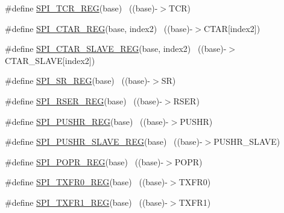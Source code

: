 \begin{DoxyCompactItemize}
\item 
\#define \hyperlink{group___s_p_i___register___accessor___macros_gac7b659989db7f592b223186299d8535e}{S\+P\+I\+\_\+\+T\+C\+R\+\_\+\+R\+EG}(base)                                            ~((base)-\/$>$T\+CR)
\item 
\#define \hyperlink{group___s_p_i___register___accessor___macros_ga5ab762c9000b796d14c1ce822eefc436}{S\+P\+I\+\_\+\+C\+T\+A\+R\+\_\+\+R\+EG}(base,  index2)                            ~((base)-\/$>$C\+T\+AR\mbox{[}index2\mbox{]})
\item 
\#define \hyperlink{group___s_p_i___register___accessor___macros_ga2025336cecfcf0c5b7cdb30e8056505b}{S\+P\+I\+\_\+\+C\+T\+A\+R\+\_\+\+S\+L\+A\+V\+E\+\_\+\+R\+EG}(base,  index2)                ~((base)-\/$>$C\+T\+A\+R\+\_\+\+S\+L\+A\+VE\mbox{[}index2\mbox{]})
\item 
\#define \hyperlink{group___s_p_i___register___accessor___macros_ga0621f5a9016db52860125b33dd3519a2}{S\+P\+I\+\_\+\+S\+R\+\_\+\+R\+EG}(base)                                              ~((base)-\/$>$SR)
\item 
\#define \hyperlink{group___s_p_i___register___accessor___macros_ga9f132bbe51ac921e48eb67afd580ed34}{S\+P\+I\+\_\+\+R\+S\+E\+R\+\_\+\+R\+EG}(base)                                          ~((base)-\/$>$R\+S\+ER)
\item 
\#define \hyperlink{group___s_p_i___register___accessor___macros_gacca7ae364ed1cf69ce3a13c76691ce63}{S\+P\+I\+\_\+\+P\+U\+S\+H\+R\+\_\+\+R\+EG}(base)                                        ~((base)-\/$>$P\+U\+S\+HR)
\item 
\#define \hyperlink{group___s_p_i___register___accessor___macros_gab2be31eae2e6d72caaac8897ed48099f}{S\+P\+I\+\_\+\+P\+U\+S\+H\+R\+\_\+\+S\+L\+A\+V\+E\+\_\+\+R\+EG}(base)                            ~((base)-\/$>$P\+U\+S\+H\+R\+\_\+\+S\+L\+A\+VE)
\item 
\#define \hyperlink{group___s_p_i___register___accessor___macros_ga57ef11c450e1a45e272be2849083977b}{S\+P\+I\+\_\+\+P\+O\+P\+R\+\_\+\+R\+EG}(base)                                          ~((base)-\/$>$P\+O\+PR)
\item 
\#define \hyperlink{group___s_p_i___register___accessor___macros_ga71b7e1c40b7f2d11e956b9814be20261}{S\+P\+I\+\_\+\+T\+X\+F\+R0\+\_\+\+R\+EG}(base)                                        ~((base)-\/$>$T\+X\+F\+R0)
\item 
\#define \hyperlink{group___s_p_i___register___accessor___macros_ga9011fe0adbd2dce8076c23bbe8aef929}{S\+P\+I\+\_\+\+T\+X\+F\+R1\+\_\+\+R\+EG}(base)                                        ~((base)-\/$>$T\+X\+F\+R1)

\end{DoxyCompactItemize}
